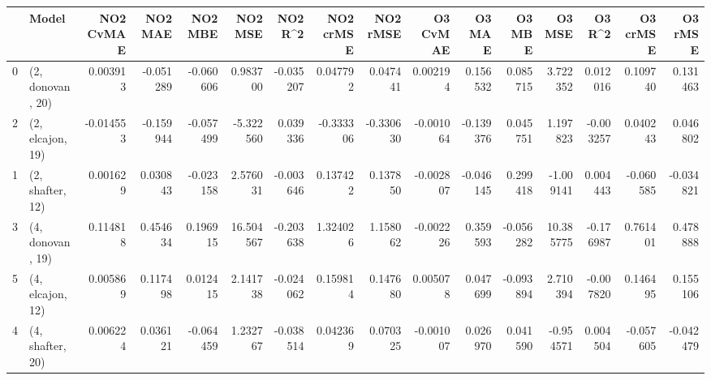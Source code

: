\begin{tabular}{llrrrrrrrrrrrrrr}
\toprule
{} &             Model &  NO2 CvMAE &   NO2 MAE &   NO2 MBE &    NO2 MSE &   NO2 R\textasciicircum2 &  NO2 crMSE &  NO2 rMSE &  O3 CvMAE &    O3 MAE &    O3 MBE &     O3 MSE &    O3 R\textasciicircum2 &  O3 crMSE &   O3 rMSE \\
\midrule
0 &  (2, donovan, 20) &   0.003913 & -0.051289 & -0.060606 &   0.983700 & -0.035207 &   0.047792 &  0.047441 &  0.002194 &  0.156532 &  0.085715 &   3.722352 &  0.012016 &  0.109740 &  0.131463 \\
2 &  (2, elcajon, 19) &  -0.014553 & -0.159944 & -0.057499 &  -5.322560 &  0.039336 &  -0.333306 & -0.330630 & -0.001064 & -0.139376 &  0.045751 &   1.197823 & -0.003257 &  0.040243 &  0.046802 \\
1 &  (2, shafter, 12) &   0.001629 &  0.030843 & -0.023158 &   2.576031 & -0.003646 &   0.137422 &  0.137850 & -0.002807 & -0.046145 &  0.299418 &  -1.009141 &  0.004443 & -0.060585 & -0.034821 \\
3 &  (4, donovan, 19) &   0.114818 &  0.454634 &  0.196915 &  16.504567 & -0.203638 &   1.324026 &  1.158062 & -0.002226 &  0.359593 & -0.056282 &  10.385775 & -0.176987 &  0.761401 &  0.478888 \\
5 &  (4, elcajon, 12) &   0.005869 &  0.117498 &  0.012415 &   2.141738 & -0.024062 &   0.159814 &  0.147680 &  0.005078 &  0.047699 & -0.093894 &   2.710394 & -0.007820 &  0.146495 &  0.155106 \\
4 &  (4, shafter, 20) &   0.006224 &  0.036121 & -0.064459 &   1.232767 & -0.038514 &   0.042369 &  0.070325 & -0.001007 &  0.026970 &  0.041590 &  -0.954571 &  0.004504 & -0.057605 & -0.042479 \\
\bottomrule
\end{tabular}
